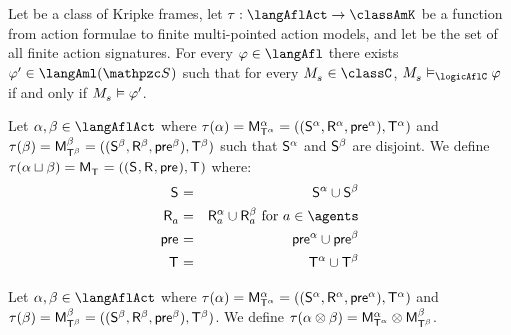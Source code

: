 \begin{proposition}
Let \classC{} be a class of Kripke frames, let $\tau : \langAflAct \to \classAmK$ be a function from action formulae to finite multi-pointed action models, and let \aSignatureFamily{} be the set of all finite action signatures.
For every $\phi \in \langAfl$ there exists $\phi' \in \langAml(\aSignatureFamily)$ such that for every $\kPModel{\kStateS} \in \classC$, $\kPModel{\kStateS} \entails_\logicAflC \phi$ if and only if $\kPModel{\kStateS} \entails \phi'$.
\end{proposition}

\begin{definition}\label{afl-choice}
Let $\alpha, \beta \in \langAflAct$ where $\tau(\alpha) = \aPModel[\alpha]{\aStatesT[\alpha]} = \aPModelTuple[\alpha]{\aStatesT[\alpha]}$ and $\tau(\beta) = \aPModel[\beta]{\aStatesT[\beta]} = \aPModelTuple[\beta]{\aStatesT[\beta]}$ such that $\aStates[\alpha]$ and $\aStates[\beta]$ are disjoint.
We define $\tau(\alpha \choice \beta) = \aPModel{\aStatesT} = \aPModelTuple{\aStatesT}$ where:
\begin{eqnarray*}
    \aStates &=& \aStates[\alpha] \cup \aStates[\beta]\\
    \aAccessibility{\agentA} &=& \aAccessibility[\alpha]{\agentA} \cup \aAccessibility[\beta]{\agentA} \text{ for } \agentA \in \agents\\
    \aPrecondition &=& \aPrecondition[\alpha] \cup \aPrecondition[\beta]\\
    \aStatesT &=& \aStatesT[\alpha] \cup \aStatesT[\beta]
\end{eqnarray*}
\end{definition}

\begin{definition}\label{afl-sequential}
Let $\alpha, \beta \in \langAflAct$ where $\tau(\alpha) = \aPModel[\alpha]{\aStatesT[\alpha]} = \aPModelTuple[\alpha]{\aStatesT[\alpha]}$ and $\tau(\beta) = \aPModel[\beta]{\aStatesT[\beta]} = \aPModelTuple[\beta]{\aStatesT[\beta]}$.
We define $\tau(\alpha \compose \beta) = \aPModel[\alpha]{\aStatesT[\alpha]} \exec \aPModel[\beta]{\aStatesT[\beta]}$.
\end{definition}

